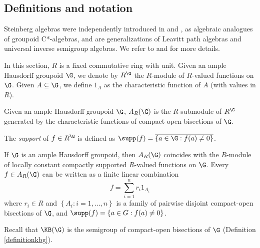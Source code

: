\subsection{Definitions and notation}

Steinberg algebras were independently introduced in \cite{MR2565546} and \cite{MR3274831}, as algebraic analogues of groupoid C*-algebras, and are generalizations of Leavitt path algebras and universal inverse semigroup algebras. We refer to \cite{MR3743184} and \cite{carlsenrout2017} for more details.

In this section, $R$ is a fixed commutative ring with unit. Given an ample Hausdorff groupoid $\G$, we denote by $R^{\G}$ the $R$-module of $R$-valued functions on $\G$. Given $A\subseteq\G$, we define $1_A$ as the characteristic function of $A$ (with values in $R$).

\begin{definition}[{\cite[Definition 4.1]{MR2565546}}]
Given an ample Hausdorff groupoid $\G$, $A_R(\G)$ is the $R$-submodule of $R^{\G}$ generated by the characteristic functions of compact-open bisections of $\G$.
\end{definition}

The \emph{support} of $f\in R^{\G}$ is defined as $\supp(f)=\overline{\left\{a\in\G:f(a)\neq 0\right\}}$.

\begin{proposition}[{\cite[Lemma 3.3.]{MR3274831}}]
If $\G$ is an ample Hausdorff groupoid, then $A_R(\G)$ coincides with the $R$-module of locally constant compactly supported $R$-valued functions on $\G$. Every $f\in A_R(\G)$ can be written as a finite linear combination
\[f=\sum_{i=1}^n r_i1_{A_i}\]
where $r_i\in R$ and $\left\{A_i:i=1,\ldots,n\right\}$ is a family of pairwise disjoint compact-open bisections of $\G$, and $\supp(f)=\left\{a\in G:f(a)\neq 0\right\}$.
\end{proposition}

Recall that $\KB(\G)$ is the semigroup of compact-open bisections of $\G$ (Definition \ref{definitionkbg}).

